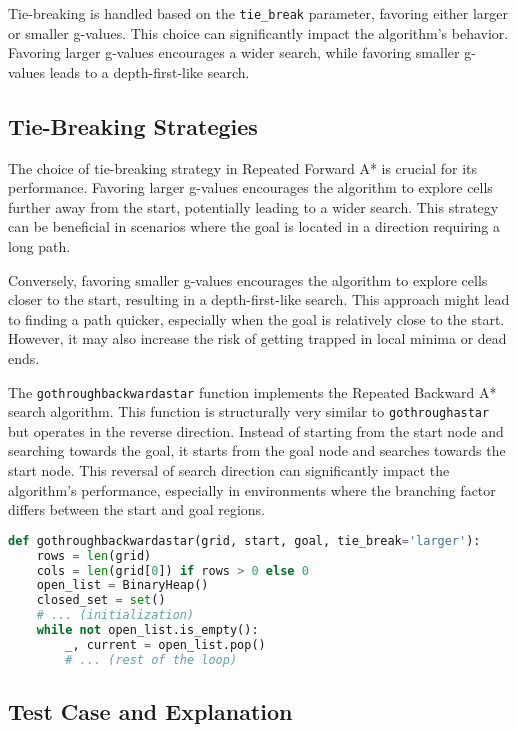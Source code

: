\documentclass[12pt]{article}
\begin{document}
Tie-breaking is handled based on the \texttt{tie\_break} parameter, 
favoring either larger or smaller g-values. 
This choice can significantly impact the algorithm's behavior. 
Favoring larger g-values encourages a wider search, 
while favoring smaller g-values leads to a depth-first-like search.

\subsection{Tie-Breaking Strategies}

The choice of tie-breaking strategy in Repeated Forward A* is crucial for its performance. 
Favoring larger g-values encourages the algorithm to explore cells further away from the start, 
potentially leading to a wider search. 
This strategy can be beneficial in scenarios where the goal is located in a direction requiring a long path.

Conversely, 
favoring smaller g-values encourages the algorithm to explore cells closer to the start, 
resulting in a depth-first-like search. 
This approach might lead to finding a path quicker, 
especially when the goal is relatively close to the start. 
However, it may also increase the risk of getting trapped in local minima or dead ends.

The \texttt{gothroughbackwardastar} function implements the Repeated Backward A* search algorithm. 
This function is structurally very similar to \texttt{gothroughastar} but operates in the reverse direction. 
Instead of starting from the start node and searching towards the goal, 
it starts from the goal node and searches towards the start node. 
This reversal of search direction can significantly impact the algorithm's performance, 
especially in environments where the branching factor differs between the start and goal regions.

\begin{lstlisting}[language=Python, basicstyle=\ttfamily]
def gothroughbackwardastar(grid, start, goal, tie_break='larger'):
    rows = len(grid)
    cols = len(grid[0]) if rows > 0 else 0
    open_list = BinaryHeap()
    closed_set = set()
    # ... (initialization)
    while not open_list.is_empty():
        _, current = open_list.pop()
        # ... (rest of the loop)
\end{lstlisting}

\subsection{Test Case and Explanation}
\end{document}
